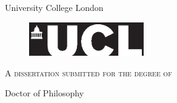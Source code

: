 
\pagestyle{empty}                       %

\begin{center}
\vspace*{1cm}
{\Huge\bf \thetitle}\\ %
\vspace*{3cm}
{\Large \theauthor}\\ %
\vspace*{2cm}

\vfill

{\Large University College London}

\vspace*{1.5cm}
\begin{figure}[h!]
 \centering
 \includegraphics[width=50mm]{logos/ucllogo-black.eps}
\end{figure}
\vspace*{1.5cm}
\textsc{A dissertation submitted for the degree of}

Doctor of Philosophy
\monthname{} \the\year
\end{center}

\newpage
\pagestyle{plain}                               %